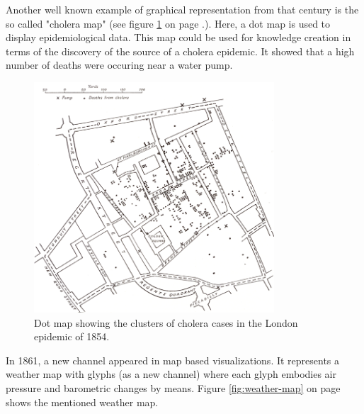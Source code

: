Another well known example of graphical representation from that century is the so called "cholera map" (see figure \ref{fig:cholera-map} on page \pageref{fig:cholera-map}.). Here, a dot map is used to display epidemiological data. This map could be used for knowledge creation in terms of the discovery of the source of a cholera epidemic. It showed that a high number of deaths were occuring near a water pump.

\begin{figure}[!htb]
\centering
\includegraphics[width=0.8\textwidth,keepaspectratio]{images/history/cholera2.png}
\caption[
    Dot map showing the clusters of cholera cases in the London epidemic of 1854., Urldate: 07.2016 \newline
\small\texttt{\url{http://datavis.ca/milestones//admin/uploads/images/tufte/snow.gif}}
]{Dot map showing the clusters of cholera cases in the London epidemic of 1854.}
\label{fig:cholera-map}
\end{figure}

In 1861, a new channel appeared in map based visualizations. It represents a weather map with glyphs (as a new channel) where each glyph embodies air pressure and barometric changes by means. Figure \ref{fig:weather-map} on page \pageref{fig:weather-map} shows the mentioned weather map.

